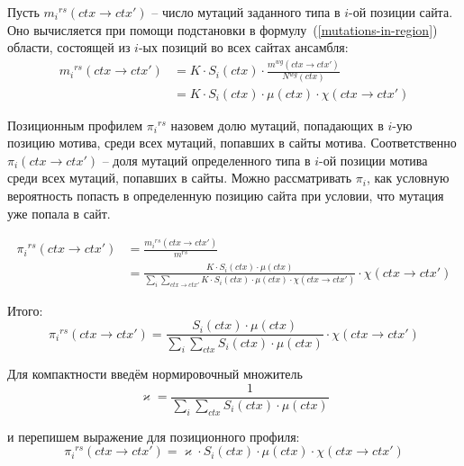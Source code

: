 \documentclass[a4paper]{article}
\newcommand\wg{{}^{wg}}
\newcommand\rs{{}^{rs}}
\newcommand\sumctx{\sum_{ctx}}
\newcommand\dirctx{ctx\to ctx'}
\newcommand\sumdirctx{\sum_{\dirctx}}
\newcommand\mutinregion{m \in rs}
\begin{document}
Пусть $m_i\rs(\dirctx)$ -- число мутаций заданного типа в $i$-ой позиции сайта. Оно вычисляется при помощи подстановки в формулу~(\ref{mutations-in-region}) области, состоящей из $i$-ых позиций во всех сайтах ансамбля:
\begin{equation}
\begin{split}
	m_i\rs(\dirctx) &= K\cdot S_i(ctx)\cdot\frac{m\wg(\dirctx)}{N\wg(ctx)} \\
				    &= K\cdot S_i(ctx)\cdot\mu(ctx)\cdot\chi(\dirctx)
\end{split}
\end{equation}

Позиционным профилем $\pi_i\rs$ назовем долю мутаций, попадающих в $i$-ую позицию мотива, среди всех мутаций, попавших в сайты мотива. Соответственно $\pi_i(\dirctx)$ -- доля мутаций определенного типа в $i$-ой позиции мотива среди всех мутаций, попавших в сайты. Можно рассматривать $\pi_i$, как условную вероятность попасть в определенную позицию сайта при условии, что мутация уже попала в сайт.

\begin{equation*}
\begin{split}
\pi_i\rs(\dirctx) &= \frac{m_i\rs(\dirctx)}{m\rs}\\
         		  &= \frac{K\cdot S_i(ctx)\cdot\mu(ctx)}{\sum_i\sumdirctx K\cdot S_i(ctx)\cdot\mu(ctx)\cdot\chi(\dirctx)}\cdot\chi(\dirctx)
\end{split}
\end{equation*}

\noindent Итого:
\begin{equation}
\pi_i\rs(\dirctx) = \frac{S_i(ctx)\cdot\mu(ctx)}{\sum_i\sumctx S_i(ctx)\cdot\mu(ctx)}\cdot\chi(\dirctx)
\end{equation}

Для компактности введём нормировочный множитель
\begin{equation}
	\varkappa = \frac{1}{\sum_i\sumctx S_i(ctx)\cdot\mu(ctx)}
\end{equation}

и перепишем выражение для позиционного профиля:
\begin{equation}\label{eq:positional_preference}
	\pi_i\rs(\dirctx) = \varkappa\cdot S_i(ctx)\cdot\mu(ctx)\cdot\chi(\dirctx)
\end{equation}
\end{document}
